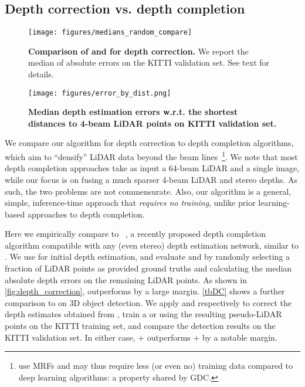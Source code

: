 \subsection{Depth correction vs. depth completion}
\begin{figure}
	\centering
	\begin{minipage}[t]{.53\textwidth}
		\centering
		\texttt{[image: figures/medians\_random\_compare]}
		\caption{\textbf{Comparison of \GDC and \PnP for depth correction.} We report the median of absolute errors on the KITTI validation set. See text for details. \label{fig:depth_correction}}
	\end{minipage}
	\hfill
	\begin{minipage}[t]{.43\textwidth}
		\centering
		\texttt{[image: figures/error\_by\_dist.png]}
		\caption{\textbf{Median depth estimation errors w.r.t. the shortest distances to 4-beam LiDAR points on KITTI validation set.} \label{fig:DepthValue_shortdist}}
	\end{minipage}
\end{figure}
We compare our \GDC algorithm for depth correction to depth completion algorithms, which aim to ``densify'' LiDAR data beyond the beam lines~\citep{wang2018plug,tomasello2018dscnet,ma2019self,yang2019dense,cheng2018depth, torres2004statistical}\footnote{\cite{torres2004statistical} use MRFs and may thus require less (or even no) training data compared to deep learning algorithms: a property shared by GDC.}. We note that most depth completion approaches take as input a 64-beam LiDAR and a single image, while our focus is on fusing a much sparser 4-beam LiDAR and stereo depths. As such, the two problems are not commensurate. Also, our \GDC algorithm is a general, simple, inference-time approach that \emph{requires no training}, unlike prior learning-based approaches to depth completion.



Here we empirically compare to \PnP~\citep{wang2018plug}, a recently proposed depth completion algorithm compatible with any (even stereo) depth estimation network, similar to \GDC. We use \SDN for initial depth estimation, and evaluate \GDC and \PnP by randomly selecting a fraction of LiDAR points as provided ground truths and calculating the median absolute depth errors on the remaining LiDAR points.
As shown in \autoref{fig:depth_correction}, \GDC outperforms \PnP by a large margin.
\autoref{tbDC} shows a further comparison to \PnP on 3D object detection. We apply \PnP and \GDC respectively to correct the depth estimates obtained from \SDN, train a \PRCNN or \vPIXOR using the resulting pseudo-LiDAR points on the KITTI training set, and compare the detection results on the KITTI validation set. In either case, \SDN + \GDC outperforms \SDN + \PnP by a notable margin.




